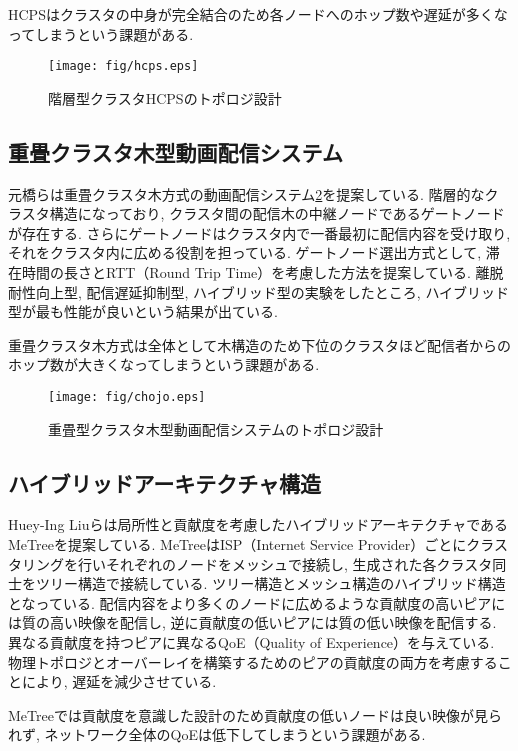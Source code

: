 HCPSはクラスタの中身が完全結合のため各ノードへのホップ数や遅延が多くなってしまうという課題がある.

\begin{figure}
  \centering
  \texttt{[image: fig/hcps.eps]}
  \caption{階層型クラスタHCPSのトポロジ設計}
  \label{fig:hcps}
\end{figure}

\subsection{重畳クラスタ木型動画配信システム}
元橋らは重畳クラスタ木方式の動画配信システム\cite{chojo}\ref{fig:chojo}を提案している. 階層的なクラスタ構造になっており, クラスタ間の配信木の中継ノードであるゲートノードが存在する. さらにゲートノードはクラスタ内で一番最初に配信内容を受け取り, それをクラスタ内に広める役割を担っている. ゲートノード選出方式として, 滞在時間の長さとRTT（Round Trip Time）を考慮した方法を提案している. 離脱耐性向上型, 配信遅延抑制型, ハイブリッド型の実験をしたところ, ハイブリッド型が最も性能が良いという結果が出ている.

重畳クラスタ木方式は全体として木構造のため下位のクラスタほど配信者からのホップ数が大きくなってしまうという課題がある.

\begin{figure}
  \centering
  \texttt{[image: fig/chojo.eps]}
  \caption{重畳型クラスタ木型動画配信システムのトポロジ設計}
  \label{fig:chojo}
\end{figure}

\newpage

\subsection{ハイブリッドアーキテクチャ構造}
Huey-Ing Liuらは局所性と貢献度を考慮したハイブリッドアーキテクチャであるMeTree\cite{metree}を提案している. MeTreeはISP（Internet Service Provider）ごとにクラスタリングを行いそれぞれのノードをメッシュで接続し, 生成された各クラスタ同士をツリー構造で接続している. ツリー構造とメッシュ構造のハイブリッド構造となっている. 配信内容をより多くのノードに広めるような貢献度の高いピアには質の高い映像を配信し, 逆に貢献度の低いピアには質の低い映像を配信する. 異なる貢献度を持つピアに異なるQoE（Quality of Experience）を与えている. 物理トポロジとオーバーレイを構築するためのピアの貢献度の両方を考慮することにより, 遅延を減少させている.

MeTreeでは貢献度を意識した設計のため貢献度の低いノードは良い映像が見られず, ネットワーク全体のQoEは低下してしまうという課題がある.

